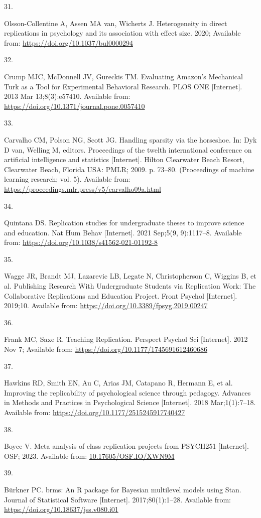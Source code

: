 \documentclass[
  english,
  a4paper,
]{article}
\newlength{\cslhangindent}
\newlength{\csllabelwidth}
\newenvironment{CSLReferences}[2] %
{\begin{list}{}{%
			\setlength{\itemindent}{0pt}
			\setlength{\leftmargin}{0pt}
			\setlength{\parsep}{0pt}
			\ifodd #1
			\setlength{\leftmargin}{\cslhangindent}
			\setlength{\itemindent}{-1\cslhangindent}
			\fi
			\setlength{\itemsep}{#2\baselineskip}}}
	{\end{list}}
\newcommand{\CSLLeftMargin}[1]{\parbox[t]{\csllabelwidth}{\strut#1\strut}}
\newcommand{\CSLRightInline}[1]{\parbox[t]{\linewidth - \csllabelwidth}{\strut#1\strut}}
\begin{document}
\begin{CSLReferences}{0}{1}
\CSLLeftMargin{31. }%
\CSLRightInline{Olsson-Collentine A, Assen MA van, Wicherts J. Heterogeneity in direct replications in psychology and its association with effect size. 2020; Available from: \url{https://doi.org/10.1037/bul0000294}}

\CSLLeftMargin{32. }%
\CSLRightInline{Crump MJC, McDonnell JV, Gureckis TM. Evaluating {Amazon}'s {Mechanical Turk} as a {Tool} for {Experimental Behavioral Research}. PLOS ONE {[}Internet{]}. 2013 Mar 13;8(3):e57410. Available from: \url{https://doi.org/10.1371/journal.pone.0057410}}

\CSLLeftMargin{33. }%
\CSLRightInline{Carvalho CM, Polson NG, Scott JG. Handling sparsity via the horseshoe. In: Dyk D van, Welling M, editors. Proceedings of the twelth international conference on artificial intelligence and statistics {[}Internet{]}. Hilton Clearwater Beach Resort, Clearwater Beach, Florida USA: PMLR; 2009. p. 73--80. (Proceedings of machine learning research; vol. 5). Available from: \url{https://proceedings.mlr.press/v5/carvalho09a.html}}

\CSLLeftMargin{34. }%
\CSLRightInline{Quintana DS. Replication studies for undergraduate theses to improve science and education. Nat Hum Behav {[}Internet{]}. 2021 Sep;5(9, 9):1117--8. Available from: \url{https://doi.org/10.1038/s41562-021-01192-8}}

\CSLLeftMargin{35. }%
\CSLRightInline{Wagge JR, Brandt MJ, Lazarevic LB, Legate N, Christopherson C, Wiggins B, et al. Publishing {Research With Undergraduate Students} via {Replication Work}: {The Collaborative Replications} and {Education Project}. Front Psychol {[}Internet{]}. 2019;10. Available from: \url{https://doi.org/10.3389/fpsyg.2019.00247}}

\CSLLeftMargin{36. }%
\CSLRightInline{Frank MC, Saxe R. Teaching {Replication}. Perspect Psychol Sci {[}Internet{]}. 2012 Nov 7; Available from: \url{https://doi.org/10.1177/1745691612460686}}

\CSLLeftMargin{37. }%
\CSLRightInline{Hawkins RD, Smith EN, Au C, Arias JM, Catapano R, Hermann E, et al. Improving the replicability of psychological science through pedagogy. Advances in Methods and Practices in Psychological Science {[}Internet{]}. 2018 Mar;1(1):7--18. Available from: \url{https://doi.org/10.1177/2515245917740427}}

\CSLLeftMargin{38. }%
\CSLRightInline{Boyce V. Meta analysis of class replication projects from PSYCH251 {[}Internet{]}. OSF; 2023. Available from: \href{https://10.17605/OSF.IO/XWN9M}{10.17605/OSF.IO/XWN9M}}

\CSLLeftMargin{39. }%
\CSLRightInline{Bürkner PC. {brms}: An {R} package for {Bayesian} multilevel models using {Stan}. Journal of Statistical Software {[}Internet{]}. 2017;80(1):1--28. Available from: \url{https://doi.org/10.18637/jss.v080.i01}}

\end{CSLReferences}
\end{document}
